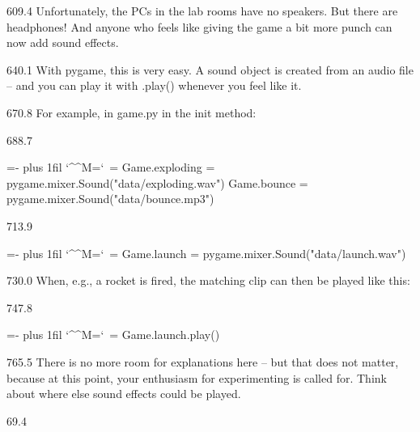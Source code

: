 \documentclass{aslab}
\makeatletter
\newcommand*\num[1]{\textcolor{codered}{#1}}
\newenvironment{pycode}{\par\ttfamily\hyphenchar\font=-1
  \lineskiplimit=-\maxdimen\lineskip=0pt\parindent=0pt
  \parfillskip=0pt plus 1fil\relax
  \catcode`\^^M=\active\catcode`\ =\active\py@setup\py@gobble}{}
\makeatother
\begin{document}
\begin{region}[pitch=13.2]{609.4}
Unfortunately, the PCs in the lab rooms have no speakers. But there are
headphones! And anyone who feels like giving the game a bit more punch can
now add sound effects.
\end{region}

\begin{region}[pitch=13.2]{640.1}
With pygame, this is very easy. A sound object is created from an audio file
-- and you can play it with .play() whenever you feel like it.
\end{region}

\begin{region}{670.8}
For example, in game.py in the init method:
\end{region}

\begin{region}[pitch=13.2]{688.7}
\begin{pycode}
Game.exploding = pygame.mixer.Sound(\num{"data/exploding.wav"})
Game.bounce = pygame.mixer.Sound(\num{"data/bounce.mp3"})
\end{pycode}
\end{region}
\begin{region}[]{713.9}
\begin{pycode}
Game.launch = pygame.mixer.Sound(\num{"data/launch.wav"})
\end{pycode}
\end{region}

\begin{region}{730.0}
When, e.g., a rocket is fired, the matching clip can then be played like
this:
\end{region}

\begin{region}[]{747.8}
\begin{pycode}
Game.launch.play()
\end{pycode}
\end{region}

\begin{region}[pitch=13.1]{765.5}
There is no more room for explanations here -- but that does not matter,
because at this point, your enthusiasm for experimenting is called for. Think
about where else sound effects could be played.
\end{region}

\nextpage
\begin{region}{69.4}
\end{region}
\end{document}
